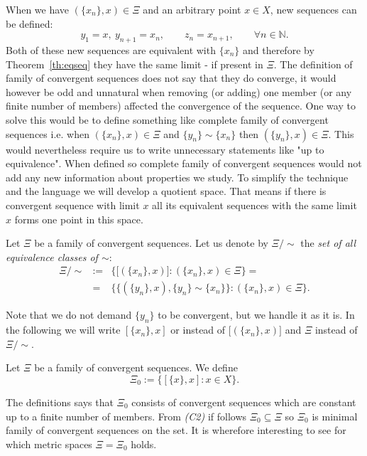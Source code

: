 When we have $(\{x_n\},x)\in\Xi$ and an arbitrary point $x\in X$, new sequences can be defined:
\[
	y_1=x,\ y_{n+1}=x_n,\qquad z_n=x_{n+1},\qquad\forall n\in \mathbb{N}.
\]
Both of these new sequences are equivalent with $\{x_n\}$ and therefore by Theorem~\ref{th:eqseq} they have the same limit - if present in $\Xi$. The definition of family of convergent sequences does not say that they do converge, it would however be odd and unnatural when removing (or adding) one member (or any finite number of members) affected the convergence of the sequence. One way to solve this would be to define something like complete family of convergent sequences i.e. when $(\{x_n\},x)\in\Xi$ and $\{y_n\} \sim \{x_n\}$ then $(\{y_n\},x)\in\Xi$. This would nevertheless require us to write unnecessary statements like "up to equivalence". When defined so complete family of convergent sequences would not add any new information about properties we study. To simplify the technique and the language we will develop a quotient space. That means if there is convergent sequence with limit $x$ all its equivalent sequences with the same limit $x$ forms one point in this space. 

\begin{define}\label{def:quosp}
Let $\Xi$ be a family of convergent sequences. Let us denote by $\Xi/\!\sim$ the \emph{set of all equivalence classes of $\sim$}:
\begin{eqnarray}
	\Xi/\!\sim & := & \bigg\{\Big[(\{x_n\},x)\Big] : (\{x_n\},x)\in\Xi \bigg\} = \nonumber\\
	& {}= & \bigg\{\Big\{(\{y_n\},x), \{y_n\} \sim \{x_n\}\Big\} : (\{x_n\},x)\in\Xi \bigg\}.\nonumber
\end{eqnarray}
\end{define}

Note that we do not demand $ \{y_n\}$ to be convergent, but we handle it as it is. In the following we will write $[\{x_n\},x]$ or instead of $[(\{x_n\},x)\Big]$ and $\Xi$ instead of $\Xi/\!\sim$.


\begin{define}\label{def:xi0}
Let $\Xi$ be a family of convergent sequences. We define
\[
	\Xi_0:=\bigg\{[\{x\},x] : x\in X\bigg\}.
\]
\end{define}
The definitions says that $\Xi_0$ consists of convergent sequences which are constant up to a finite number of members. From \emph{(C2)} if follows $\Xi_0\subseteq \Xi$ so $\Xi_0$ is minimal family of convergent sequences on the set. It is wherefore interesting to see for which metric spaces $\Xi=\Xi_0$ holds.

